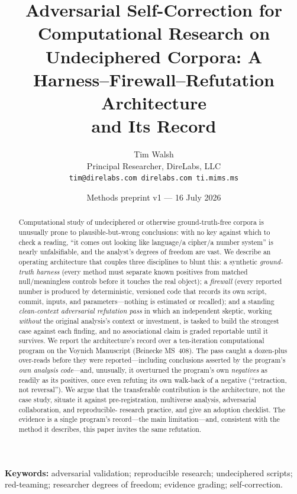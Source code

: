 \documentclass[11pt]{article}
\title{\textbf{Adversarial Self-Correction for Computational Research on\\
Undeciphered Corpora: A Harness--Firewall--Refutation Architecture\\ and Its Record}}
\author{Tim Walsh \\ \small Principal Researcher, DireLabs, LLC \\
\small \texttt{tim@direlabs.com \quad direlabs.com \quad ti.mims.ms}}
\date{Methods preprint v1 --- 16 July 2026}
\begin{document}
\maketitle

\begin{abstract}
\noindent Computational study of undeciphered or otherwise ground-truth-free corpora is
unusually prone to plausible-but-wrong conclusions: with no key against which to check a
reading, ``it comes out looking like language/a cipher/a number system'' is nearly
unfalsifiable, and the analyst's degrees of freedom are vast. We describe an operating
architecture that couples three disciplines to blunt this: a synthetic \emph{ground-truth
harness} (every method must separate known positives from matched null/meaningless
controls before it touches the real object); a \emph{firewall} (every reported number is
produced by deterministic, versioned code that records its own script, commit, inputs, and
parameters---nothing is estimated or recalled); and a standing \emph{clean-context
adversarial refutation pass} in which an independent skeptic, working \emph{without} the
original analysis's context or investment, is tasked to build the strongest case against
each finding, and no associational claim is graded reportable until it survives. We report
the architecture's record over a ten-iteration computational program on the Voynich
Manuscript (Beinecke MS~408). The pass caught a dozen-plus over-reads before they were
reported---including conclusions asserted by the program's \emph{own analysis code}---and,
unusually, it overturned the program's own \emph{negatives} as readily as its positives,
once even refuting its own walk-back of a negative (``retraction, not reversal''). We argue
that the transferable contribution is the architecture, not the case study, situate it
against pre-registration, multiverse analysis, adversarial collaboration, and reproducible-
research practice, and give an adoption checklist. The evidence is a single program's
record---the main limitation---and, consistent with the method it describes, this paper
invites the same refutation.
\end{abstract}

\noindent\textbf{Keywords:} adversarial validation; reproducible research; undeciphered
scripts; red-teaming; researcher degrees of freedom; evidence grading; self-correction.
\end{document}

